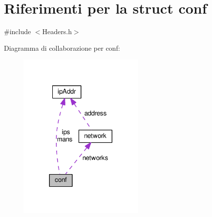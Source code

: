 \hypertarget{structconf}{}\section{Riferimenti per la struct conf}
\label{structconf}


{\ttfamily \#include $<$Headers.\+h$>$}



Diagramma di collaborazione per conf\+:\nopagebreak
\begin{figure}[H]
\begin{center}
\leavevmode
\includegraphics[width=176pt]{structconf__coll__graph}
\end{center}
\end{figure}

